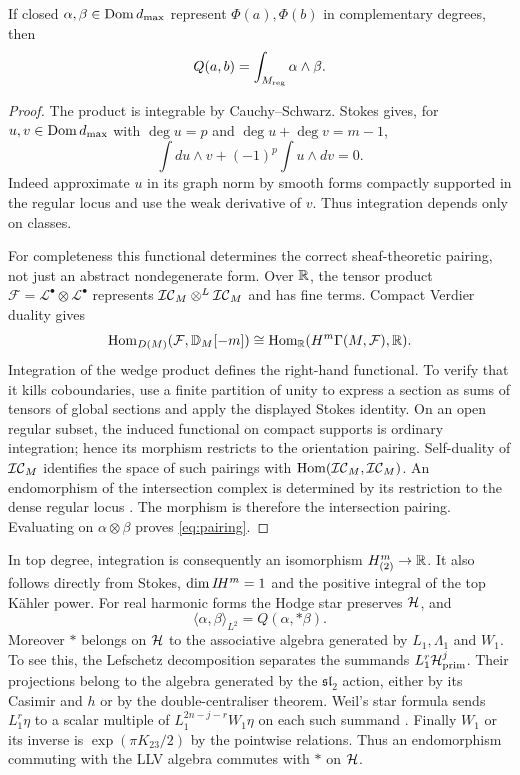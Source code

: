 \begin{proposition}\label{prop:pairing}
If closed $\alpha,\beta\in\operatorname{Dom} d_{\max}$ represent
$\Phi(a),\Phi(b)$ in complementary degrees, then
\begin{equation}\label{eq:pairing}
 Q(a,b)=\int_{M_{\mathrm{reg}}}\alpha\wedge\beta.
\end{equation}
\end{proposition}
\begin{proof}
The product is integrable by Cauchy--Schwarz. Stokes gives, for
$u,v\in\operatorname{Dom} d_{\max}$ with $\deg u=p$ and
$\deg u+\deg v=m-1$,
\[
 \int du\wedge v+(-1)^p\int u\wedge dv=0.
\]
Indeed approximate $u$ in its graph norm by smooth forms
compactly supported in the regular locus and use the weak
derivative of $v$. Thus integration depends only on classes.

For completeness this functional determines the correct
sheaf-theoretic pairing, not just an abstract nondegenerate
form. Over $\mathbb R$, the tensor product
$\mathcal F=\mathcal L^\bullet\otimes\mathcal L^\bullet$
represents $\mathcal{IC}_M\otimes^L\mathcal{IC}_M$ and has fine terms.
Compact Verdier duality gives
\[
 \operatorname{Hom}_{D(M)}(\mathcal F,\mathbb D_M[-m])
 \cong\operatorname{Hom}_{\mathbb R}(H^m\Gamma(M,\mathcal F),\mathbb R).
\]
Integration of the wedge product defines the right-hand
functional. To verify that it kills coboundaries, use a finite
partition of unity to express a section as sums of tensors
of global sections and apply the displayed Stokes identity.
On an open regular subset, the induced functional on compact
supports is ordinary integration; hence its morphism restricts
to the orientation pairing. Self-duality of $\mathcal{IC}_M$ identifies
the space of such pairings with $\operatorname{Hom}(\mathcal{IC}_M,\mathcal{IC}_M)$.
An endomorphism of the intersection complex is determined by
its restriction to the dense regular locus
\cite[\S\S3.5 and 5.3]{gm83}. The morphism is therefore the
intersection pairing. Evaluating on $\alpha\otimes\beta$
proves \eqref{eq:pairing}.
\end{proof}

In top degree, integration is consequently an isomorphism
$H^m_{(2)}\to\mathbb R$. It also follows directly from Stokes,
$\dim I\!H^m=1$ and the positive integral of the top K\"ahler
power. For real harmonic forms the Hodge star preserves
$\mathcal H$, and
\begin{equation}\label{eq:positive-pairing}
 \langle\alpha,\beta\rangle_{L^2}=Q(\alpha,*\beta).
\end{equation}
Moreover $*$ belongs on $\mathcal H$ to the associative algebra
generated by $L_1,\Lambda_1$ and $W_1$. To see this, the
Lefschetz decomposition separates the summands
$L_1^r\mathcal H^j_{\rm prim}$. Their projections belong to the
algebra generated by the $\mathfrak{sl}_2$ action, either by
its Casimir and $h$ or by the double-centraliser theorem.
Weil's star formula sends $L_1^r\eta$ to a scalar multiple of
$L_1^{2n-j-r}W_1\eta$ on each such summand
\cite[Proposition~1.2.31]{huybrechts05}. Finally $W_1$ or its
inverse is $\exp(\pi K_{23}/2)$ by the pointwise relations.
Thus an endomorphism commuting with the LLV algebra commutes
with $*$ on $\mathcal H$.

